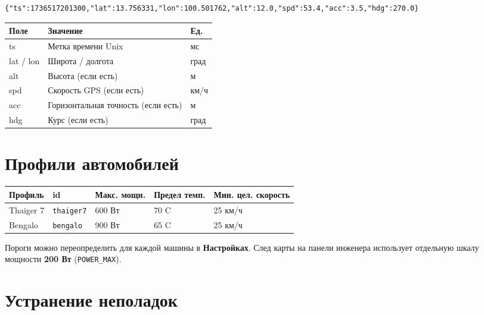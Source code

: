 \documentclass[11pt,a4paper,oneside]{report}
\newcommand{\degC}{\textdegree C}
\newcommand{\code}[1]{\texttt{#1}}
\begin{document}
\begin{lstlisting}
{"ts":1736517201300,"lat":13.756331,"lon":100.501762,"alt":12.0,"spd":53.4,"acc":3.5,"hdg":270.0}
\end{lstlisting}

\begin{tabularx}{\linewidth}{@{}lLl@{}}
\toprule
\textbf{Поле} & \textbf{Значение} & \textbf{Ед.}\\
\midrule
ts & Метка времени Unix & мс\\
lat / lon & Широта / долгота & град\\
alt & Высота (если есть) & м\\
spd & Скорость GPS (если есть) & км/ч\\
acc & Горизонтальная точность (если есть) & м\\
hdg & Курс (если есть) & град\\
\bottomrule
\end{tabularx}

\section{Профили автомобилей}

\begin{tabularx}{\linewidth}{@{}llllL@{}}
\toprule
\textbf{Профиль} & \textbf{id} & \textbf{Макс. мощн.} & \textbf{Предел темп.} & \textbf{Мин. цел. скорость}\\
\midrule
Thaiger 7 & \code{thaiger7} & 600 Вт & 70 \degC{} & 25 км/ч\\
Bengalo & \code{bengalo} & 900 Вт & 65 \degC{} & 25 км/ч\\
\bottomrule
\end{tabularx}

\medskip
Пороги можно переопределить для каждой машины в \textbf{Настройках}. След карты на
панели инженера использует отдельную шкалу мощности \textbf{200 Вт}
(\code{POWER\_MAX}).

\section{Устранение неполадок}
\end{document}
